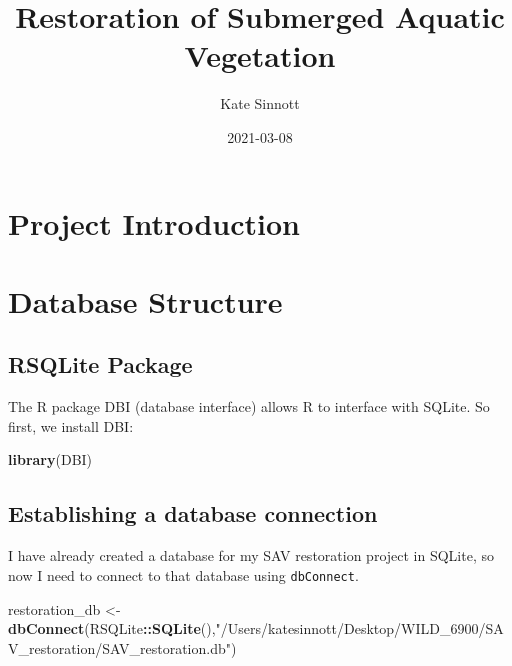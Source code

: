 \documentclass[
]{book}
\title{Restoration of Submerged Aquatic Vegetation}
\author{Kate Sinnott}
\date{2021-03-08}
\newenvironment{Shaded}{\begin{snugshade}}{\end{snugshade}}
\newcommand{\KeywordTok}[1]{\textcolor[rgb]{0.13,0.29,0.53}{\textbf{#1}}}
\newcommand{\NormalTok}[1]{#1}
\newcommand{\OperatorTok}[1]{\textcolor[rgb]{0.81,0.36,0.00}{\textbf{#1}}}
\newcommand{\StringTok}[1]{\textcolor[rgb]{0.31,0.60,0.02}{#1}}
\begin{document}
\maketitle

{
\setcounter{tocdepth}{1}
\tableofcontents
}
\hypertarget{project-introduction}{%
\chapter{Project Introduction}\label{project-introduction}}

\hypertarget{database-structure}{%
\chapter{Database Structure}\label{database-structure}}

\hypertarget{rsqlite-package}{%
\section{RSQLite Package}\label{rsqlite-package}}

The R package DBI (database interface) allows R to interface with SQLite. So first,
we install DBI:

\begin{Shaded}
\begin{Highlighting}[]
\KeywordTok{library}\NormalTok{(DBI)}
\end{Highlighting}
\end{Shaded}

\hypertarget{establishing-a-database-connection}{%
\section{Establishing a database connection}\label{establishing-a-database-connection}}

I have already created a database for my SAV restoration project in SQLite,
so now I need to connect to that database using \texttt{dbConnect}.

\begin{Shaded}
\begin{Highlighting}[]
\NormalTok{restoration_db <-}\StringTok{ }\KeywordTok{dbConnect}\NormalTok{(RSQLite}\OperatorTok{::}\KeywordTok{SQLite}\NormalTok{(),}\StringTok{"/Users/katesinnott/Desktop/WILD_6900/SAV_restoration/SAV_restoration.db"}\NormalTok{)}
\end{Highlighting}
\end{Shaded}
\end{document}
